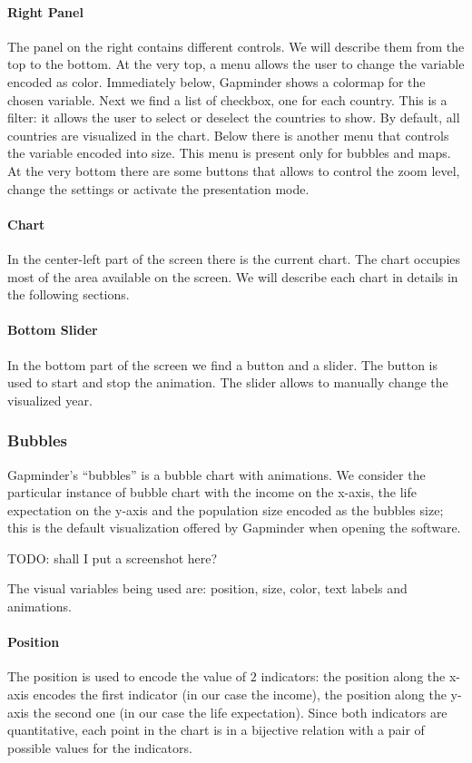 \paragraph{Right Panel}
The panel on the right contains different controls.
We will describe them from the top to the bottom.
At the very top, a menu allows the user to change the variable encoded as color.
Immediately below, Gapminder shows a colormap for the chosen variable.
Next we find a list of checkbox, one for each country.
This is a filter: it allows the user to select or deselect the countries to show.
By default, all countries are visualized in the chart.
Below there is another menu that controls the variable encoded into size.
This menu is present only for bubbles and maps.
At the very bottom there are some buttons that allows to control the zoom level, change the settings or activate the presentation mode.

\paragraph{Chart}
In the center-left part of the screen there is the current chart.
The chart occupies most of the area available on the screen.
We will describe each chart in details in the following sections.

\paragraph{Bottom Slider}
In the bottom part of the screen we find a button and a slider.
The button is used to start and stop the animation.
The slider allows to manually change the visualized year.

\subsubsection{Bubbles}
Gapminder's ``bubbles'' is a bubble chart with animations.
We consider the particular instance of bubble chart with the income on the x-axis, the life expectation on the y-axis and the population size encoded as the bubbles size; this is the default visualization offered by Gapminder when opening the software.

\vspace{0.5cm}
TODO: shall I put a screenshot here?

The visual variables being used are: position, size, color, text labels and animations.

\paragraph{Position}
The position is used to encode the value of $2$ indicators: the position along the x-axis encodes the first indicator (in our case the income), the position along the y-axis the second one (in our case the life expectation).
Since both indicators are quantitative, each point in the chart is in a bijective relation with a pair of possible values for the indicators.

